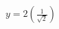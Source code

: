 \documentclass[preview]{standalone}
\begin{document}
\begin{align*}
y = 2\left(\frac{1}{\sqrt{2}}\right)
\end{align*}
\end{document}

